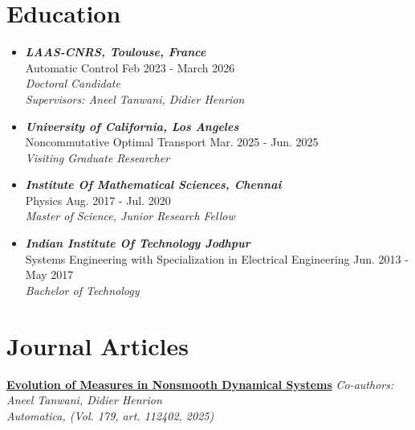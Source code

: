\documentclass[letter]{res}
\begin{document}
\name{\textcolor{Bittersweet}{SAROJ PRASAD CHHATOI}\\
}
\address{+33-749254998}
\address{
  \texttt{spchhatoi@laas.fr}\\ 
  \texttt{chhatoisaroj@gmail.com}
}
\begin{resume}
  \noindent\makebox[\linewidth]{\rule{\paperwidth}{0.4pt}}


\section{\textcolor{Bittersweet}{Education}}
 \begin{itemize}
 \item {\sl \textbf{LAAS-CNRS, Toulouse, France}
} \\ Automatic Control \hfill  Feb 2023 - March 2026\\
\textit{Doctoral Candidate\\ Supervisors: Aneel Tanwani, Didier Henrion}
  \item {\sl \textbf{University of California, Los Angeles}
}\\ Noncommutative Optimal Transport \hfill Mar. 2025 - Jun. 2025 \\
\textit{Visiting Graduate Researcher } 
 \item {\sl \textbf{Institute Of Mathematical Sciences, Chennai}
} \\ Physics \hfill  Aug. 2017 - Jul. 2020\\
\textit{Master of Science, Junior Research Fellow }
 
 \item {\sl \textbf{Indian Institute Of Technology Jodhpur}
}\\ Systems Engineering  with Specialization in Electrical Engineering \hfill Jun. 2013 - May 2017 \\
\textit{Bachelor of Technology } 
   
 \end{itemize}
   \vspace{-2mm}

\section{\textcolor{Bittersweet}{Journal Articles}}
\href{https://www.sciencedirect.com/science/article/pii/S0005109825002961}{\textbf{Evolution of Measures in Nonsmooth Dynamical Systems}} \newline  
{\sl Co-authors: Aneel Tanwani, Didier Henrion \\
Automatica, (Vol. 179, art. 112402, 2025)
}


\end{resume}
\end{document}
